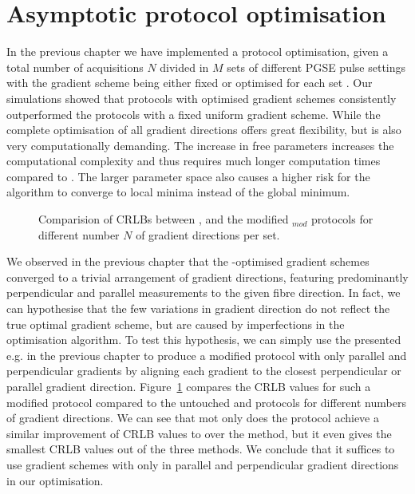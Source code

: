 \section{Asymptotic protocol optimisation}
In the previous chapter we have implemented a \SF{} protocol optimisation, given a total number of acquisitions $N$ divided in $M$ sets of different {\gls{PGSE}} pulse settings with the gradient scheme being either fixed {\OI} or optimised  for each set {\FD}. Our simulations showed that protocols with optimised gradient schemes consistently outperformed the protocols with a fixed uniform gradient scheme. While the complete optimisation of all gradient directions offers great flexibility, but is also very computationally demanding. The increase in free parameters increases the computational complexity and thus requires much longer computation times compared to {\OI}. The larger parameter space also causes a higher risk for the algorithm to converge to local minima instead of the global minimum. 

\begin{figure}
\centering
	
\caption{Comparision of CRLBs between \OI{}, \SF{} and the modified \SF$_{mod}$ protocols for different number $N$ of gradient directions per set.}
\label{fig:chapter8 DIRSvsCRLB60mT mod}
\end{figure}


We observed in the previous chapter that the \SF-optimised gradient schemes converged to a trivial arrangement of gradient directions, featuring predominantly perpendicular and parallel measurements to the given fibre direction. In fact, we can hypothesise that the few variations in gradient direction do not reflect the true optimal gradient scheme, but are caused by imperfections in the optimisation algorithm. To test this hypothesis, we can simply use the \FD{} presented e.g. in the previous chapter to produce a modified \FDmod{} protocol with only parallel and perpendicular gradients by aligning each gradient  to the closest perpendicular or parallel gradient direction. Figure~\ref{fig:chapter8 DIRSvsCRLB60mT mod} compares the CRLB values for such a modified \FDmod{} protocol compared to the untouched \FD{} and \OI{} protocols for different numbers of gradient directions. We can see that mot only does the \FDmod{} protocol achieve a similar improvement of CRLB values to \FD over the \OI method, but it even gives the smallest CRLB values out of the three methods. We conclude that it suffices to use gradient schemes with only in parallel and perpendicular gradient directions in our optimisation.
 

